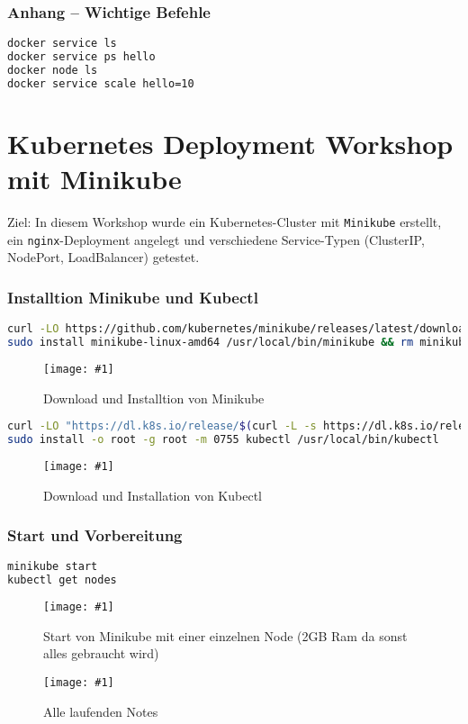\documentclass[BMR,Seminar,ngerman,IEEE]{twbook}
\newcommand{\screenshotH}[3]{%
  \begin{figure}[H]
    \centering
    \texttt{[image: \#1]}%
    \caption{#2}%
    \label{fig:#3}%
  \end{figure}%
}
\begin{document}
\subsection{Anhang – Wichtige Befehle}
\begin{lstlisting}[language=bash]
docker service ls
docker service ps hello
docker node ls
docker service scale hello=10
\end{lstlisting}

\chapter{Kubernetes Deployment Workshop mit Minikube}

Ziel: In diesem Workshop wurde ein Kubernetes-Cluster mit \texttt{Minikube} erstellt, ein \texttt{nginx}-Deployment angelegt und verschiedene Service-Typen (ClusterIP, NodePort, LoadBalancer) getestet.

\subsection{Installtion Minikube und Kubectl}
\begin{lstlisting}[language=bash,caption={Installation von Minikube}]
curl -LO https://github.com/kubernetes/minikube/releases/latest/download/minikube-linux-amd64
sudo install minikube-linux-amd64 /usr/local/bin/minikube && rm minikube-linux-amd64
\end{lstlisting}
\screenshotH{minikube_install.png}{Download und Installtion von Minikube}{minikube-install}
\FloatBarrier

\begin{lstlisting}[language=bash,caption={Installation von Kubectl}]
curl -LO "https://dl.k8s.io/release/$(curl -L -s https://dl.k8s.io/release/stable.txt)/bin/linux/amd64/kubectl"
sudo install -o root -g root -m 0755 kubectl /usr/local/bin/kubectl
\end{lstlisting}
\screenshotH{kubectl_install.png}{Download und Installation von Kubectl}{kubectl-install}
\FloatBarrier

\subsection{Start und Vorbereitung}
\begin{lstlisting}[language=bash,caption={Start von Minikube und Überprüfung der Umgebung}]
minikube start
kubectl get nodes
\end{lstlisting}
\screenshotH{minikube_start_2mb.png}{Start von Minikube mit einer einzelnen Node (2GB Ram da sonst alles gebraucht wird)}{minikube-start}
\FloatBarrier
\screenshotH{minikube_get_nodes.png}{Alle laufenden Notes}{minikube-get-nodes}
\FloatBarrier
\end{document}
